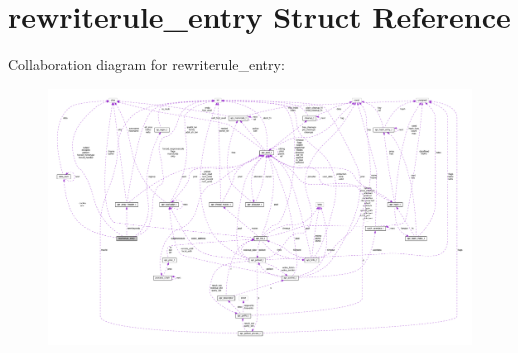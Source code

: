 \hypertarget{structrewriterule__entry}{}\section{rewriterule\+\_\+entry Struct Reference}
\label{structrewriterule__entry}


Collaboration diagram for rewriterule\+\_\+entry\+:
\nopagebreak
\begin{figure}[H]
\begin{center}
\leavevmode
\includegraphics[width=350pt]{structrewriterule__entry__coll__graph}
\end{center}
\end{figure}
